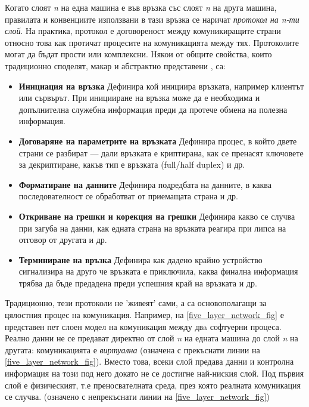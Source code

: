\documentclass[12pt,a4paper,oneside]{book}
\begin{document}
Когато слоят \textit{n} на една машина е във връзка със слоят \textit{n} на
друга машина, правилата и конвенциите използвани в тази връзка се наричат
\textit{протокол на n-ти слой}. На практика, протокол е договореност
между комуникиращите страни относно това как протичат процесите на
комуникацията между тях. \cite{tanenbaum_computer_2011} Протоколите могат да
бъдат прости или комплексни. Някои от общите
свойства, които традиционно споделят, макар и абстрактно представени
\cite{sanders_practical_2011}, са:

\begin{itemize}
  \item \textbf{Инициация на връзка} Дефинира кой инициира връзката, например
    клиентът или сървърът. При иницииране на връзка може да е необходима и
    допълнителна служебна информация преди да протече обмена на полезна
    информация.
  \item \textbf{Договаряне на параметрите на връзката} Дефинира процес, в който
    двете страни се разбират --- дали връзката е криптирана, как се пренасят
    ключовете за декриптиране, какъв тип е връзката (full/half duplex) и др.
  \item \textbf{Форматиране на данните} Дефинира подредбата на данните, в каква
    последователност се обработват от приемащата страна и др.
  \item \textbf{Откриване на грешки и корекция на грешки} Дефинира какво се
    случва при загуба на данни, как едната страна на връзката реагира при липса
    на отговор от другата и др.
  \item \textbf{Терминиране на връзка} Дефинира как дадено крайно устройство
    сигнализира на друго че връзката е приключила, каква финална информация
    трябва да бъде предадена преди успешния край на връзката и др.
\end{itemize}

Традиционно, тези протоколи не 'живеят' сами, а са основополагащи за цялостния
процес на комуникация.  Например, на \autoref{five_layer_network_fig} е
представен пет слоен модел на комуникация между двa софтуерни процеса. Реално
данни не се предават директно от слой \textit{n} на едната машина до слой
\textit{n} на другата: комуникацията е \textit{виртуална} (означена с прекъснати
линии на \autoref{five_layer_network_fig}).
Вместо това, всеки слой предава данни и контролна информация на този под него
докато не се достигне най-ниския слой. Под първия слой е физическият, т.е
преносвателната среда, през която реалната комуникация се случва. (означено с
непрекъснати линии на \autoref{five_layer_network_fig})
\end{document}
